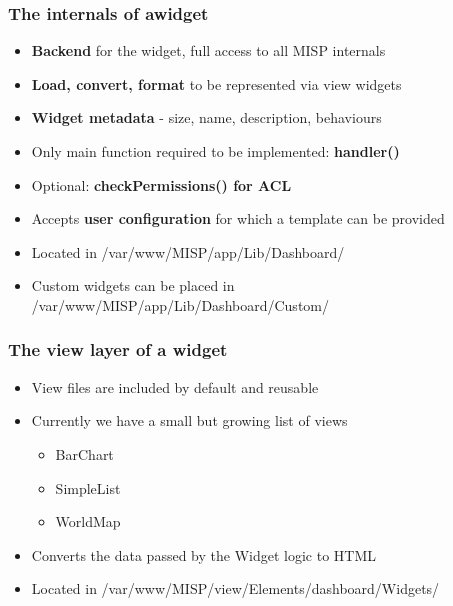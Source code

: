 \begin{frame}
  \frametitle{The internals of awidget}
        \begin{itemize} 
            \item {\bf Backend} for the widget, full access to all MISP internals
            \item {\bf Load, convert, format} to be represented via view widgets
            \item {\bf Widget metadata} - size, name, description, behaviours
            \item Only main function required to be implemented: {\bf handler()}
            \item Optional: {\bf checkPermissions() for ACL}
            \item Accepts {\bf user configuration} for which a template can be provided
            \item Located in /var/www/MISP/app/Lib/Dashboard/
            \item Custom widgets can be placed in /var/www/MISP/app/Lib/Dashboard/Custom/
        \end{itemize}
\end{frame}

\begin{frame}
  \frametitle{The view layer of a widget}
  \begin{itemize}
        \item View files are included by default and reusable
        \item Currently we have a small but growing list of views
        \begin{itemize}
            \item BarChart
            \item SimpleList
            \item WorldMap
        \end{itemize}
        \item Converts the data passed by the Widget logic to HTML
        \item Located in /var/www/MISP/view/Elements/dashboard/Widgets/
  \end{itemize}
\end{frame}

